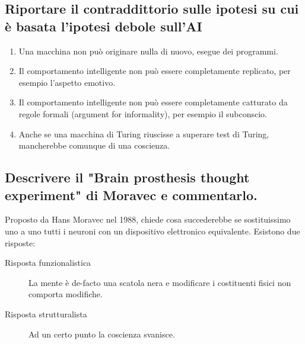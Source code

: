 \documentclass[\main/main.tex]{subfiles}
\begin{document}
\subsection{Riportare il contraddittorio sulle ipotesi su cui è basata l'ipotesi debole sull'AI}
\begin{enumerate}
  \item Una macchina non può originare nulla di nuovo, esegue dei programmi.
  \item Il comportamento intelligente non può essere completamente replicato, per esempio l'aspetto emotivo.
  \item Il comportamento intelligente non può essere completamente catturato da regole formali (argument for informality), per esempio il subconscio.
  \item Anche se una macchina di Turing riuscisse a superare test di Turing, mancherebbe comunque di una coscienza.
\end{enumerate}

\subsection{Descrivere il "Brain prosthesis thought experiment" di Moravec e commentarlo.}
Proposto da Hans Moravec nel 1988, chiede cosa succederebbe se sostituissimo uno a uno tutti i neuroni con un dispositivo elettronico equivalente. Esistono due risposte:
\begin{description}
  \item[Risposta funzionalistica] La mente è de-facto una scatola nera e modificare i costituenti fisici non comporta modifiche.
  \item[Risposta strutturalista] Ad un certo punto la coscienza svanisce.
\end{description}
\end{document}

